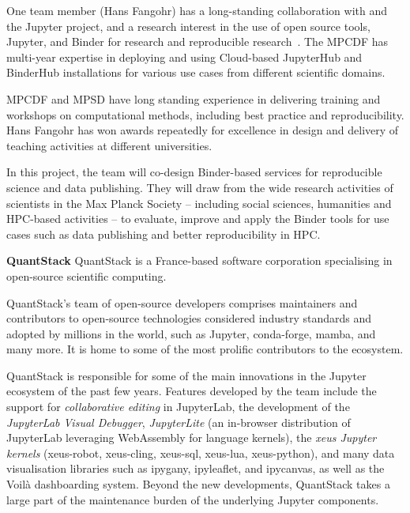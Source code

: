One team member (Hans Fangohr) has a long-standing collaboration with 
and the Jupyter project, and a research interest in the use of open source
tools, Jupyter, and Binder for research and reproducible
research~\cite{Fangohr:ICALEPCS2017-TUCPA01,Fangohr2020,nbval-arxiv,Beg2021}.
The MPCDF has multi-year expertise in deploying and using Cloud-based
JupyterHub and BinderHub installations for various use cases from different
scientific domains.

MPCDF and MPSD have long standing experience in delivering training and
workshops on computational methods, including best practice and reproducibility.
Hans Fangohr has won awards repeatedly for excellence in design and delivery of
teaching activities at different universities.

In this project, the team will co-design Binder-based services for
reproducible science and data publishing. They will draw from the wide research
activities of scientists in the Max Planck Society -- including social sciences,
humanities and HPC-based activities -- to evaluate, improve and apply the Binder
tools for use cases such as data publishing and better reproducibility in HPC.

\noindent \textbf{QuantStack}
QuantStack is a France-based software corporation specialising in open-source
scientific computing.

QuantStack's team of open-source developers comprises maintainers and contributors
to open-source technologies considered industry standards and adopted by millions
in the world, such as Jupyter, conda-forge, mamba, and many more. It is home to
some of the most prolific contributors to the ecosystem.

QuantStack is responsible for some of the main innovations in the Jupyter ecosystem
of the past few years. Features developed by the team include the support for
\emph{collaborative editing} in JupyterLab, the development of the \emph{JupyterLab Visual Debugger},
\emph{JupyterLite} (an in-browser distribution of JupyterLab leveraging WebAssembly for language kernels),
the \emph{xeus Jupyter kernels} (xeus-robot, xeus-cling, xeus-sql, xeus-lua, xeus-python),
and many data visualisation libraries such as ipygany, ipyleaflet, and ipycanvas,
as well as the Voilà dashboarding system. Beyond the new developments, QuantStack takes
a large part of the maintenance burden of the underlying Jupyter components.

